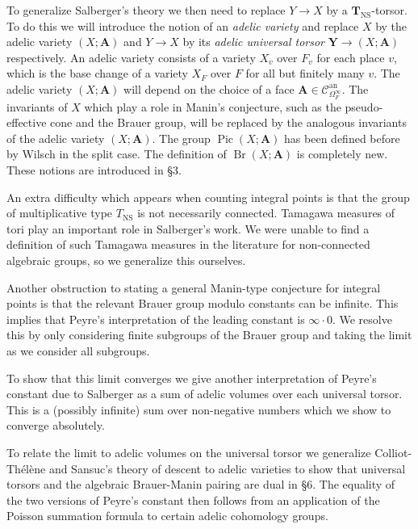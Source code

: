 \documentclass[a4paper,11pt,reqno]{amsart}
\DeclareMathOperator{\Pic}{Pic}
\DeclareMathOperator{\NS}{NS}
\DeclareMathOperator{\Br}{Br}
\DeclareMathOperator{\an}{an}
\theoremstyle{definition}
\begin{document}
To generalize Salberger's theory we then need to replace $Y \to X$ by a $\mathbf{T}_{\NS}$-torsor. To do this we will introduce the notion of an \emph{adelic variety} and replace $X$ by the adelic variety $(X ; \mathbf{A})$ and $Y \to X$ by its \emph{adelic universal torsor} $\mathbf{Y} \to (X ; \mathbf{A})$ respectively. An adelic variety consists of a variety $X_v$ over $F_v$ for each place $v$, which is the base change of a variety $X_F$ over $F$ for all but finitely many $v$. The adelic variety $(X ; \mathbf{A})$ will depend on the choice of a face $\mathbf{A} \in \mathcal{C}^{\an}_{\Omega_{F}^{\infty}}$. The invariants of $X$ which play a role in Manin's conjecture, such as the pseudo-effective cone and the Brauer group, will be replaced by the analogous invariants of the adelic variety $(X ; \mathbf{A})$. The group $\Pic (X ; \mathbf{A})$ has been defined before by Wilsch \cite[Def. 2.2.1]{Wilsch2022Integral} in the split case. The definition of $\Br (X ; \mathbf{A})$ is completely new. These notions are introduced in \S3.

An extra difficulty which appears when counting integral points is that the group of multiplicative type $T_{\NS}$ is not necessarily connected. Tamagawa measures of tori play an important role in Salberger's work. We were unable to find a definition of such Tamagawa measures in the literature for non-connected algebraic groups, so we generalize this ourselves.

Another obstruction to stating a general Manin-type conjecture for integral points is that the relevant Brauer group modulo constants can be infinite. This implies that Peyre's interpretation of the leading constant is $\infty \cdot 0$. We resolve this by only considering finite subgroups of the Brauer group and taking the limit as we consider all subgroups. 

To show that this limit converges we give another interpretation of Peyre's constant due to Salberger as a sum of adelic volumes over each universal torsor. This is a (possibly infinite) sum over non-negative numbers which we show to converge absolutely.

To relate the limit to adelic volumes on the universal torsor we generalize Colliot-Th\'elène and Sansuc's theory of descent \cite{Colliot1987Descente} to adelic varieties to show that universal torsors and the algebraic Brauer-Manin pairing are dual in \S 6. The equality of the two versions of Peyre's constant then follows from an application of the Poisson summation formula to certain adelic cohomology groups.
\end{document}
